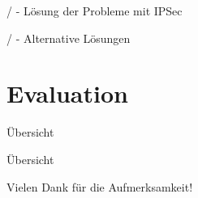 \documentclass{beamer}
\begin{document}
\begin{frame}{}{\secname/\subsecname}
- Lösung der Probleme mit IPSec\\
\end{frame}

\begin{frame}{}{\secname/\subsecname}
- Alternative Lösungen
\end{frame}

\section{Evaluation}

\begin{frame}{Übersicht}
\tableofcontents[sectionstyle=show/shaded, subsectionstyle=show/hide/hide]
\end{frame}

\begin{frame}{\secname}{\subsecname}
\end{frame}




\begin{frame}[plain]{Übersicht}
	\tableofcontents[sectionstyle=show/show, subsectionstyle=show/hide/hide]
\begin{center}
Vielen Dank für die Aufmerksamkeit!
\end{center}
\end{frame}


\nocite{rfc:socks}
\nocite{rfc:ipsec}
\nocite{rfc:tls}
\nocite{pctcp}
\nocite{tcp-over-dtls}
{\tiny


}

\end{document}
